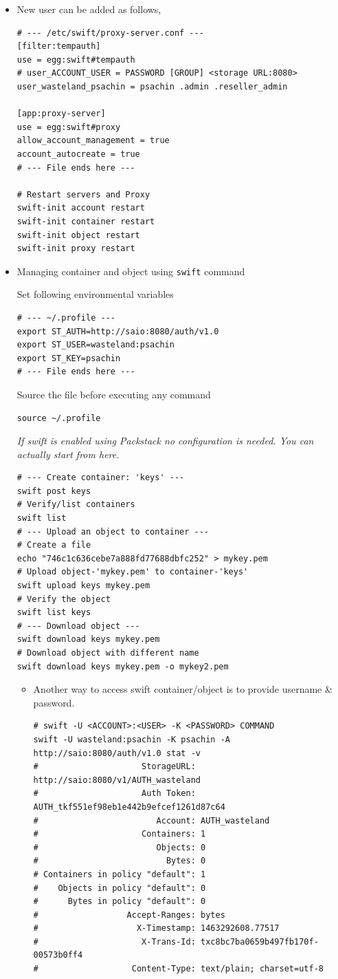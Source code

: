 \documentclass{article}
\begin{document}
\begin{itemize}
\item New user can be added as follows,
\begin{verbatim}
# --- /etc/swift/proxy-server.conf ---
[filter:tempauth]
use = egg:swift#tempauth
# user_ACCOUNT_USER = PASSWORD [GROUP] <storage URL:8080>
user_wasteland_psachin = psachin .admin .reseller_admin

[app:proxy-server]
use = egg:swift#proxy
allow_account_management = true
account_autocreate = true
# --- File ends here ---

# Restart servers and Proxy
swift-init account restart
swift-init container restart
swift-init object restart
swift-init proxy restart
\end{verbatim}
\item Managing container and object using \texttt{swift} command

Set following environmental variables
\begin{verbatim}
# --- ~/.profile ---
export ST_AUTH=http://saio:8080/auth/v1.0
export ST_USER=wasteland:psachin
export ST_KEY=psachin
# --- File ends here ---
\end{verbatim}

Source the file before executing any command
\begin{verbatim}
source ~/.profile
\end{verbatim}

\emph{If swift is enabled using Packstack no configuration is needed.
You can actually start from here.}
\begin{verbatim}
# --- Create container: 'keys' ---
swift post keys
# Verify/list containers
swift list
# --- Upload an object to container ---
# Create a file
echo "746c1c636cebe7a888fd77688dbfc252" > mykey.pem
# Upload object-'mykey.pem' to container-'keys'
swift upload keys mykey.pem
# Verify the object
swift list keys
# --- Download object ---
swift download keys mykey.pem
# Download object with different name
swift download keys mykey.pem -o mykey2.pem
\end{verbatim}

\begin{itemize}
\item Another way to access swift container/object is to provide
username \& password.
\begin{verbatim}
# swift -U <ACCOUNT>:<USER> -K <PASSWORD> COMMAND
swift -U wasteland:psachin -K psachin -A http://saio:8080/auth/v1.0 stat -v
#                     StorageURL: http://saio:8080/v1/AUTH_wasteland
#                     Auth Token: AUTH_tkf551ef98eb1e442b9efcef1261d87c64
#                        Account: AUTH_wasteland
#                     Containers: 1
#                        Objects: 0
#                          Bytes: 0
# Containers in policy "default": 1
#    Objects in policy "default": 0
#      Bytes in policy "default": 0
#                  Accept-Ranges: bytes
#                    X-Timestamp: 1463292608.77517
#                     X-Trans-Id: txc8bc7ba0659b497fb170f-00573b0ff4
#                   Content-Type: text/plain; charset=utf-8


\end{verbatim}
\end{itemize}
\end{itemize}
\end{document}
